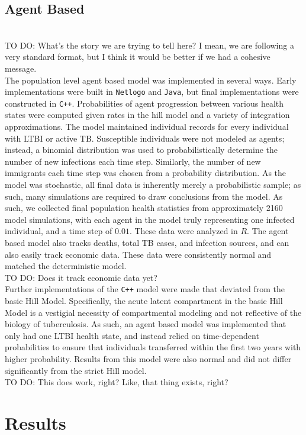 \documentclass{amsart}
\newcommand{\TODO}[1]{\hfill\\{\huge \color{red} TO DO:} #1 \hfill \\}
\begin{document}
\subsection{Agent Based}
\TODO{What's the story we are trying to tell here? I mean, we are following a
  very standard format, but I think it would be better if we had a cohesive
  message.}
The population level agent based model was implemented in several ways. Early
implementations were built in \texttt{Netlogo} and \texttt{Java}, but final
implementations were constructed in \texttt{C++}. Probabilities of agent
progression between various health states were computed given rates in the hill
model and a variety of integration approximations. The model maintained
individual records for every individual with LTBI or active TB. Susceptible
individuals were not modeled as agents; instead, a binomial distribution was
used to probabilistically determine the number of new infections each time step.
Similarly, the number of new immigrants each time step was chosen from a
probability distribution. As the model was stochastic, all final data is
inherently merely a probabilistic sample; as such, many simulations are required
to draw conclusions from the model. As such, we collected final population
health statistics from approximately 2160 model simulations, with each agent in
the model truly representing one infected individual, and a time step of $0.01$.
These data were analyzed in $R$. The agent based model also tracks deaths, total
TB cases, and infection sources, and can also easily track economic data. These
data were consistently normal and matched the deterministic model. 
\TODO{Does it track economic data yet?}

Further implementations of the \texttt{C++} model were made that deviated from
the basic Hill Model. Specifically, the acute latent compartment in the basic
Hill Model is a vestigial necessity of compartmental modeling and not reflective
of the biology of tuberculosis. As such, an agent based model was implemented
that only had one LTBI health state, and instead relied on time-dependent
probabilities to ensure that individuals transferred within the first two years
with higher probability. Results from this model were also normal and did not
differ significantly from the strict Hill model. 
\TODO{This does work, right? Like, that thing exists, right?}

\section{Results}
\end{document}
